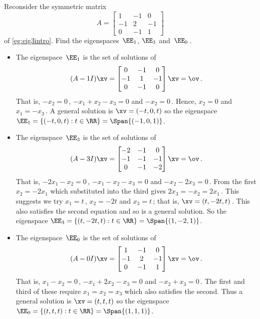 \begin{example} \label{eg:eig3sp}
Reconsider the symmetric matrix
\begin{equation*}
A=\begin{bmatrix} 1&-1&0\\-1&2&-1\\0&-1&1 \end{bmatrix}
\end{equation*}
of \autoref{eg:eig3intro}. 
Find the eigenspaces~\(\EE_1\), \(\EE_3\) and~\(\EE_0\)\,.
\begin{solution} 
\begin{itemize}
\item The eigenspace~\(\EE_1\) is the set of solutions of
\begin{equation*}
(A-1I)\xv=\begin{bmatrix} 0&-1&0\\-1&1&-1\\0&-1&0 \end{bmatrix}
\xv=\ov\,.
\end{equation*}
That is, \(-x_2=0\)\,, \(-x_1+x_2-x_3=0\) and \(-x_2=0\)\,.
Hence, \(x_2=0\) and \(x_1=-x_3\)\,.
A general solution is \(\xv=(-t,0,t)\) so the eigenspace \(\EE_1=\{(-t,0,t) : t\in\RR\}=\Span\{(-1,0,1)\}\).

\item The eigenspace~\(\EE_3\) is the set of solutions of
\begin{equation*}
(A-3I)\xv=\begin{bmatrix} -2&-1&0\\-1&-1&-1\\0&-1&-2 \end{bmatrix}
\xv=\ov\,.
\end{equation*}
That is, \(-2x_1-x_2=0\)\,, \(-x_1-x_2-x_3=0\) and \(-x_2-2x_3=0\)\,.
From the first \(x_2=-2x_1\) which substituted into the third gives \(2x_3=-x_2=2x_1\)\,.  
This suggests we try \(x_1=t\)\,, \(x_2=-2t\) and \(x_3=t\)\,; that is, \(\xv=(t,-2t,t)\)\,.
This also satisfies the second equation and so is a general solution.
So the eigenspace \(\EE_3=\{(t,-2t,t) : t\in\RR\}=\Span\{(1,-2,1)\}\).

\item The eigenspace~\(\EE_0\) is the set of solutions of
\begin{equation*}
(A-0I)\xv=\begin{bmatrix} 1&-1&0\\-1&2&-1\\0&-1&1 \end{bmatrix}
\xv=\ov\,.
\end{equation*}
That is, \(x_1-x_2=0\)\,, \(-x_1+2x_2-x_3=0\) and \(-x_2+x_3=0\)\,.
The first and third of these require \(x_1=x_2=x_3\) which also satisfies the second.
Thus a general solution is \(\xv=(t,t,t)\) so the eigenspace \(\EE_0=\{(t,t,t) : t\in\RR\}=\Span\{(1,1,1)\}\). 
\end{itemize}
\end{solution}
\end{example}





